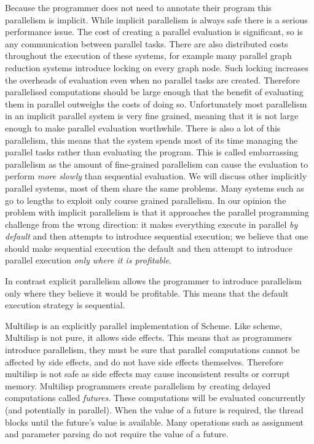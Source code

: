 Because the programmer does not need to annotate their program this
parallelism is implicit.
While implicit parallelism is always safe there is a serious performance
issue.
The cost of creating a parallel evaluation is significant,
so is any communication between parallel tasks.
There are also distributed costs throughout the execution of these systems,
for example many parallel graph reduction systems introduce locking on every
graph node.
Such locking increases the overheads of evaluation even when no parallel
tasks are created.
Therefore parallelised computations should be large enough that the benefit
of evaluating them in parallel outweighs the costs of doing so.
Unfortunately most parallelism in an implicit parallel system is very
fine grained, meaning that it is not large enough to make parallel
evaluation worthwhile.
There is also a lot of this parallelism,
this means that the system spends most of its time managing the parallel
tasks rather than evaluating the program.
This is called embarrassing parallelism as the amount of fine-grained
parallelism can cause the evaluation to perform \emph{more slowly} than
sequential evaluation.
We will discuss other implicitly parallel systems,
most of them share the same problems.
Many systems such as \citet{peyton-jones:1989:parallel-graph-reduction} go
to lengths to exploit only course grained parallelism.
In our opinion the problem with implicit parallelism is that it approaches
the parallel programming challenge from the wrong direction:
it makes everything execute in parallel \emph{by default} and then attempts
to introduce sequential execution;
we believe that one should make sequential execution the default and then
attempt to introduce parallel execution \emph{only where it is profitable}.

In contrast explicit parallelism allows the programmer to introduce
parallelism only where they believe it would be profitable.
This means that the default execution strategy is sequential.

Multilisp \citep{halstead:1984:multilisp,halstead:1985:multilisp} is an
explicitly parallel implementation of Scheme.
Like scheme, Multilisp is not pure, it allows side effects.
This means that as programmers introduce parallelism, they must be sure that
parallel computations cannot be affected by side effects,
and do not have side effects themselves.
Therefore multilisp is not safe as side effects may cause inconsistent
results or corrupt memory.
Multilisp programmers create parallelism by creating delayed computations
called \emph{futures}.
These computations will be evaluated concurrently
(and potentially in parallel).
When the value of a future is required,
the thread blocks until the future's value is available.
Many operations such as assignment and parameter parsing do not require the
value of a future.

